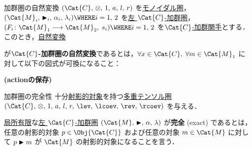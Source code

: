 \documentclass[TQFT_main]{subfiles}
\begin{document}
\begin{mydef}[label=def:module-nat,breakable]{加群圏の自然変換}
    $(\Cat{C},\, \otimes,\, 1,\, a,\, l,\, r)$ を\hyperref[redef:monoidal-category]{モノイダル圏}，
    $(\Cat{M}_i,\, \btr_i,\, \alpha_i,\, \lambda_i) \WHERE i=1,\, 2$ を\hyperref[def:modulecat]{左 $\Cat{C}$-加群圏}，
    $(F_i \colon \Cat{M}_1 \lto \Cat{M}_2,\; s_i) \WHERE i=1,\, 2$ を\hyperref[def:module-functor]{$\Cat{C}$-加群関手}とする．
    このとき，\hyperref[def:nat]{自然変換}
    \begin{center}
    \end{center}
    が\textbf{$\Cat{C}$-加群圏の自然変換}であるとは，$\forall x \in \Cat{C},\; \forall m \in \Cat{M}_1$ に対して以下の図式が可換になること：
    \begin{description}
        \item[\textbf{(actionの保存)}] 
        \begin{center}
        \end{center}
        
    \end{description}
    
\end{mydef}

\begin{mydef}[label=def:modulecat-exact]{加群圏の完全性}
    十分\hyperref[def:finite-abcat]{射影的対象}を持つ\hyperref[def:tensorfusion-cat]{多重テンソル圏} $(\Cat{C},\, \otimes,\, 1,\, a,\, l,\, r,\, \lev,\, \lcoev,\, \rev,\, \rcoev)$ を与える．

    \hyperref[def:finite-abcat]{局所有限}な\hyperref[def:modulecat]{左 $\Cat{C}$-加群圏} $(\Cat{M},\, \btr,\, \alpha,\, \lambda)$ が\textbf{完全} (exact) であるとは，任意の射影的対象 $p \in \Obj{\Cat{C}}$ および任意の対象 $m \in \Cat{M}$ に対して $p \blacktriangleright m$ が $\Cat{M}$ の射影的対象になることを言う．
\end{mydef}
\end{document}
